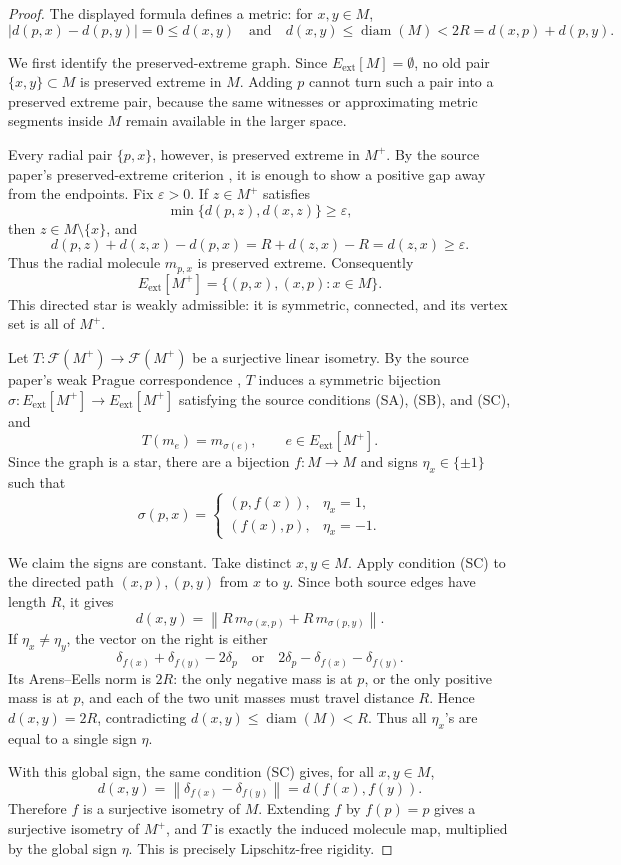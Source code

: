 \documentclass[11pt]{article}
\newcommand{\F}{\mathcal F}
\newcommand{\diam}{\operatorname{diam}}
\newcommand{\edg}{E_{\mathrm{ext}}}
\begin{document}
\begin{proof}
The displayed formula defines a metric: for \(x,y\in M\),
\[
  |d(p,x)-d(p,y)|=0\le d(x,y)
  \quad\text{and}\quad
  d(x,y)\le \diam(M)<2R=d(x,p)+d(p,y).
\]

We first identify the preserved-extreme graph.  Since \(\edg[M]=\emptyset\), no old pair \(\{x,y\}\subset M\) is preserved extreme in \(M\).  Adding \(p\) cannot turn such a pair into a preserved extreme pair, because the same witnesses or approximating metric segments inside \(M\) remain available in the larger space.

Every radial pair \(\{p,x\}\), however, is preserved extreme in \(M^+\).  By the source paper's preserved-extreme criterion \cite[Fact 2.1]{CDT}, it is enough to show a positive gap away from the endpoints.  Fix \(\varepsilon>0\).  If \(z\in M^+\) satisfies
\[
  \min\{d(p,z),d(x,z)\}\ge \varepsilon,
\]
then \(z\in M\setminus\{x\}\), and
\[
  d(p,z)+d(z,x)-d(p,x)=R+d(z,x)-R=d(z,x)\ge \varepsilon.
\]
Thus the radial molecule \(m_{p,x}\) is preserved extreme.  Consequently
\[
  \edg[M^+]=\{(p,x),(x,p):x\in M\}.
\]
This directed star is weakly admissible: it is symmetric, connected, and its vertex set is all of \(M^+\).

Let \(T:\F(M^+)\to\F(M^+)\) be a surjective linear isometry.  By the source paper's weak Prague correspondence \cite[Theorem 3.4]{CDT}, \(T\) induces a symmetric bijection \(\sigma:\edg[M^+]\to\edg[M^+]\) satisfying the source conditions (SA), (SB), and (SC), and
\[
  T(m_e)=m_{\sigma(e)},\qquad e\in\edg[M^+].
\]
Since the graph is a star, there are a bijection \(f:M\to M\) and signs \(\eta_x\in\{\pm1\}\) such that
\[
  \sigma(p,x)=
  \begin{cases}
  (p,f(x)), & \eta_x=1,\\
  (f(x),p), & \eta_x=-1.
  \end{cases}
\]

We claim the signs are constant.  Take distinct \(x,y\in M\).  Apply condition (SC) to the directed path \((x,p),(p,y)\) from \(x\) to \(y\).  Since both source edges have length \(R\), it gives
\[
  d(x,y)=\left\|R\,m_{\sigma(x,p)}+R\,m_{\sigma(p,y)}\right\|.
\]
If \(\eta_x\neq\eta_y\), the vector on the right is either
\[
  \delta_{f(x)}+\delta_{f(y)}-2\delta_p
  \quad\text{or}\quad
  2\delta_p-\delta_{f(x)}-\delta_{f(y)}.
\]
Its Arens--Eells norm is \(2R\): the only negative mass is at \(p\), or the only positive mass is at \(p\), and each of the two unit masses must travel distance \(R\).  Hence \(d(x,y)=2R\), contradicting \(d(x,y)\le \diam(M)<R\).  Thus all \(\eta_x\)'s are equal to a single sign \(\eta\).

With this global sign, the same condition (SC) gives, for all \(x,y\in M\),
\[
  d(x,y)
  =
  \left\|\delta_{f(x)}-\delta_{f(y)}\right\|
  =
  d(f(x),f(y)).
\]
Therefore \(f\) is a surjective isometry of \(M\).  Extending \(f\) by \(f(p)=p\) gives a surjective isometry of \(M^+\), and \(T\) is exactly the induced molecule map, multiplied by the global sign \(\eta\).  This is precisely Lipschitz-free rigidity.
\end{proof}
\end{document}
